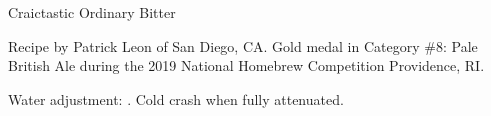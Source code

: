 \stylesection{\styleordinarybitter}

\begin{recipe}{Craictastic Ordinary Bitter}

\begin{aboutblock}
Recipe by Patrick Leon of San Diego, CA.  Gold medal in Category \#8: Pale British
Ale during the 2019 National Homebrew Competition Providence, RI. \sourceaha
\end{aboutblock}


\begin{methodandtiming}
 
\begin{mashsteps}
\end{mashsteps}

\begin{fermentationsteps}
\end{fermentationsteps}

\begin{directions}
Water adjustment: . Cold crash when fully
attenuated.
\end{directions}

\end{methodandtiming}

\recipebreak

\begin{ingredientsblock}

\begin{malts}
\end{malts}

\begin{hops}
\end{hops}


\end{ingredientsblock}

\end{recipe}
